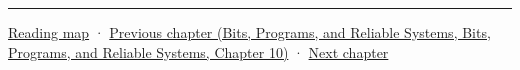\begin{center}\rule{0.5\linewidth}{0.5pt}\end{center}

\hyperref[volume-reading-map]{Reading map} · \href{../01-Bits-Programs-and-Reliable-Systems/main.pdf\#nameddest=01-foundations-i-ch012-commands-async-work-and-resource-lifetimes}{Previous chapter (Bits, Programs, and Reliable Systems, Bits, Programs, and Reliable Systems, Chapter 10)} · \hyperref[01-foundations-i-ch014-submit-synchronize-and-retire-gpu-work]{Next chapter}
